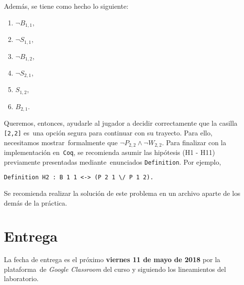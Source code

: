 \documentclass[paper=letter, fontsize=12pt]{scrartcl}
\begin{document}
Además, se tiene como hecho lo siguiente:
\begin{enumerate}[label=H\arabic*, resume]
\item $\neg B_{1,1}$,
\item $\neg S_{1,1}$,
\item $\neg B_{1,2}$,
\item $\neg S_{2,1}$,
\item $S_{1,2}$,
\item $B_{2,1}$.
\end{enumerate}
Queremos, entonces, ayudarle al jugador a decidir correctamente que la casilla \verb+[2,2]+ es\
una opción segura para continuar con su trayecto. Para ello, necesitamos mostrar\
formalmente que $\neg P_{2,2} \wedge \neg W_{2,2}$. Para finalizar con la implementación en\
\verb+Coq+, se recomienda asumir las hipótesis (H1 - H11) previamente presentadas mediante\
enunciados \verb+Definition+. Por ejemplo,
\begin{verbatim}
Definition H2 : B 1 1 <-> (P 2 1 \/ P 1 2).
\end{verbatim}\par
Se recomienda realizar la solución de este problema en un archivo aparte de los demás de la práctica.

\section{Entrega}

\noindent
La fecha de entrega es el próximo \textbf{viernes 11 de mayo de 2018} por la plataforma\
de \emph{Google Classroom} del curso y siguiendo los lineamientos del laboratorio.
\end{document}
